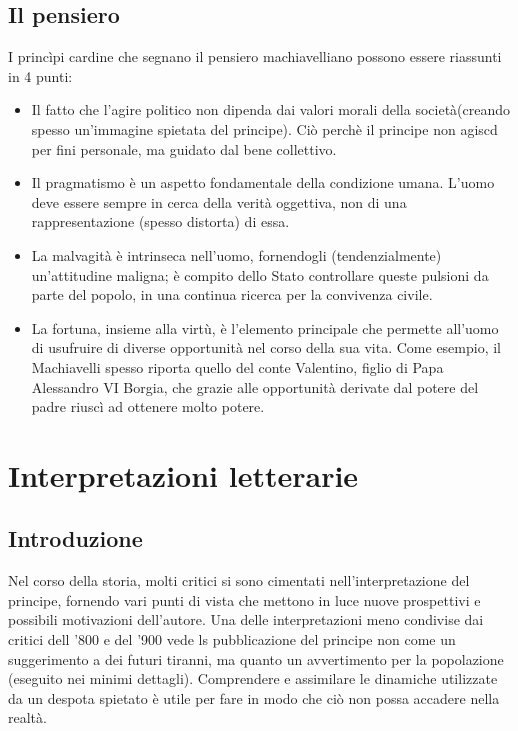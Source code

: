 \documentclass[10pt,a4paper]{report}
\begin{document}
	\section*{Il pensiero}
	
	I princìpi cardine che segnano il pensiero machiavelliano possono essere riassunti in 4 punti:
	
	\begin{itemize}
		\item Il fatto che l'agire politico non dipenda dai valori morali della società(creando spesso un'immagine spietata del principe). Ciò perchè il principe non agiscd per fini personale, ma guidato dal bene collettivo.
		\item Il pragmatismo è un aspetto fondamentale della condizione umana. L'uomo deve essere sempre in cerca della verità oggettiva, non di una rappresentazione (spesso distorta) di essa.
		\item La malvagità è intrinseca nell'uomo, fornendogli (tendenzialmente) un'attitudine maligna; è compito dello Stato controllare queste pulsioni da parte del popolo, in una continua ricerca per la convivenza civile.
		\item La fortuna, insieme alla virtù, è l'elemento principale che permette all'uomo di usufruire di diverse opportunità nel corso della sua vita. Come esempio, il Machiavelli spesso riporta quello del conte Valentino, figlio di Papa Alessandro VI Borgia, che grazie alle opportunità derivate dal potere del padre riuscì ad ottenere molto potere.
	\end{itemize}

\chapter*{Interpretazioni letterarie}

	\section*{Introduzione}
	
	Nel corso della storia, molti critici si sono cimentati nell'interpretazione del principe, fornendo vari punti di vista che mettono in luce nuove prospettivi e possibili motivazioni dell'autore. Una delle interpretazioni meno condivise dai critici dell '800 e del '900 vede ls pubblicazione del principe non come un suggerimento a dei futuri tiranni, ma quanto un avvertimento per la popolazione (eseguito nei minimi dettagli). Comprendere e assimilare le dinamiche utilizzate da un despota spietato è utile per fare in modo che ciò non possa accadere nella realtà.\\
	
\end{document}
